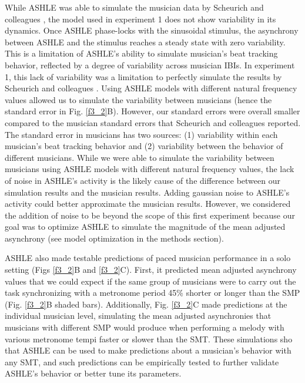 \documentclass{report}
\begin{document}
While ASHLE was able to simulate the musician data by Scheurich and colleagues \cite{scheurich2018tapping}, the model used in experiment 1 does not show variability in its dynamics. Once ASHLE phase-locks with the sinusoidal stimulus, the asynchrony between ASHLE and the stimulus reaches a steady state with zero variability. This is a limitation of ASHLE's ability to simulate musician's beat tracking behavior, reflected by a degree of variability across musician IBIs. In experiment 1, this lack of variability was a limitation to perfectly simulate the results by Scheurich and colleagues \cite{scheurich2018tapping}. Using ASHLE models with different natural frequency values allowed us to simulate the variability between musicians (hence the standard error in Fig.{} \ref{f3_2}B). However, our standard errors were overall smaller compared to the musician standard errors that Scheurich and colleagues \cite{scheurich2018tapping} reported. The standard error in musicians has two sources: (1) variability within each musician's beat tracking behavior and (2) variability between the behavior of different musicians. While we were able to simulate the variability between musicians using ASHLE models with different natural frequency values, the lack of noise in ASHLE's activity is the likely cause of the difference between our simulation results and the musician results. Adding gaussian noise to ASHLE's activity could better approximate the musician results. However, we considered the addition of noise to be beyond the scope of this first experiment because our goal was to optimize ASHLE to simulate the magnitude of the mean adjusted asynchrony (see model optimization in the methods section).

ASHLE also made testable predictions of paced musician performance in a solo setting (Figs \ref{f3_2}B and \ref{f3_2}C). First, it predicted mean adjusted asynchrony values that we could expect if the same group of musicians were to carry out the task synchronizing with a metronome period 45\% shorter or longer than the SMP (Fig.{} \ref{f3_2}B shaded bars). Additionally, Fig.{} \ref{f3_2}C made predictions at the individual musician level, simulating the mean adjusted asynchronies that musicians with different SMP would produce when performing a melody with various metronome tempi faster or slower than the SMT. These simulations sho that ASHLE can be used to make predictions about a musician's behavior with any SMT, and such predictions can be empirically tested to further validate ASHLE's behavior or better tune its parameters.
\end{document}
